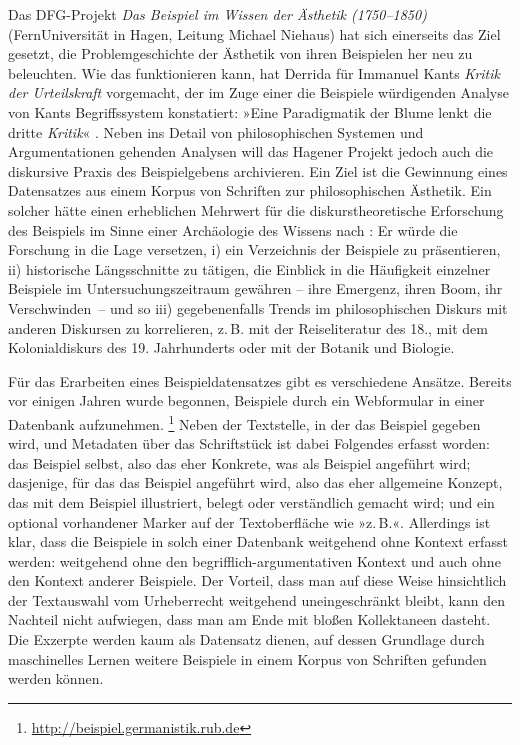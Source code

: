 \documentclass{article}
\newcommand*{\lit}{\textit}%
\begin{document}
Das DFG-Projekt \textit{Das Beispiel im Wissen der Ästhetik
  (1750--1850)} (Fern\-Uni\-versi\-tät in Hagen, Leitung Michael Niehaus)
hat sich einerseits das Ziel gesetzt, die Problemgeschichte der
Ästhetik von ihren Beispielen her neu zu beleuchten. Wie das
funktionieren kann, hat Derrida für Immanuel Kants \lit{Kritik der
  Urteilskraft} vorgemacht, der im Zuge einer die Beispiele
würdigenden Analyse von Kants Begriffssystem konstatiert: »Eine
Paradigmatik der Blume lenkt die dritte
\emph{Kritik}« \Parencite[107]{Derrida1992}. Neben ins Detail von
philosophischen Systemen und Argumentationen gehenden Analysen will
das Hagener Projekt jedoch auch die diskursive Praxis des
Beispielgebens archivieren. Ein Ziel ist die Gewinnung eines
Datensatzes aus einem Korpus von Schriften zur philosophischen
Ästhetik. Ein solcher hätte einen erheblichen Mehrwert für die
diskurstheoretische Erforschung des Beispiels im Sinne einer
Archäologie des Wissens nach \textcite{Fouc1997a}: Er würde die
Forschung in die Lage versetzen, i) ein Verzeichnis der Beispiele zu
präsentieren, ii) historische Längsschnitte zu tätigen, die Einblick
in die Häufigkeit einzelner Beispiele im Untersuchungszeitraum
gewähren -- ihre Emergenz, ihren Boom, ihr Verschwinden~-- und so iii)
gegebenenfalls Trends im philosophischen Diskurs mit anderen Diskursen
zu korrelieren, z.\,B. mit der Reiseliteratur des 18., mit dem
Kolonialdiskurs des 19. Jahrhunderts oder mit der Botanik und
Biologie.


Für das Erarbeiten eines Beispieldatensatzes gibt es verschiedene
Ansätze. Bereits vor einigen Jahren wurde begonnen, Beispiele durch
ein Webformular in einer Datenbank aufzunehmen.%
\footnote{\url{http://beispiel.germanistik.rub.de}} %
Neben der Textstelle, in der das Beispiel gegeben wird, und Metadaten
über das Schriftstück ist dabei Folgendes erfasst worden: das Beispiel
selbst, also das eher Konkrete, was als Beispiel angeführt wird;
dasjenige, für das das Beispiel angeführt wird, also das eher
allgemeine Konzept, das mit dem Beispiel illustriert, belegt oder
verständlich gemacht wird; und ein optional vorhandener Marker auf der
Textoberfläche wie »z.\,B.«. Allerdings ist klar, dass die Beispiele
in solch einer Datenbank weitgehend ohne Kontext erfasst werden:
weitgehend ohne den begrifflich-argumentativen Kontext und auch ohne
den Kontext anderer Beispiele. Der Vorteil, dass man auf diese Weise
hinsichtlich der Textauswahl vom Urheberrecht weitgehend
uneingeschränkt bleibt, kann den Nachteil nicht aufwiegen, dass man am
Ende mit bloßen Kollektaneen dasteht. Die Exzerpte werden kaum als
Datensatz dienen, auf dessen Grundlage durch maschinelles Lernen
weitere Beispiele in einem Korpus von Schriften gefunden werden
können.
\end{document}
